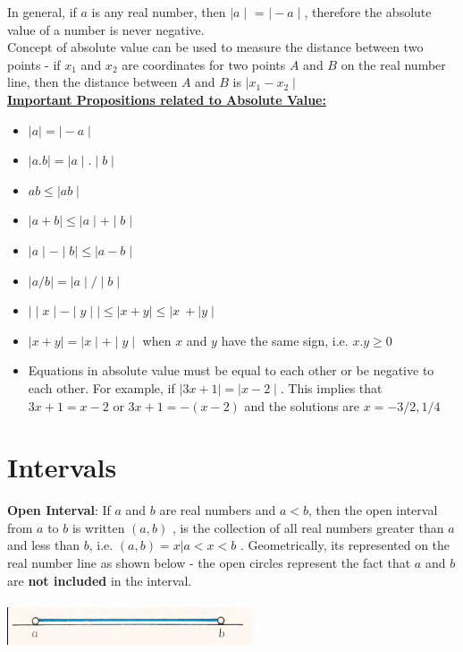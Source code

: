 \documentclass{book}
\begin{document}
In general,  if $a$ is any real number, then $\mid a \mid$ = $\mid -a \mid$, therefore the absolute value of a number is never negative. \\
Concept of absolute value can be used to measure the distance between two points - if $x_1$ and $x_2$ are coordinates for two points $A$ and $B$ on the real number line, then the distance between $A$ and $B$ is $\mid x_1 - x_2 \mid$ \\

\underline{\textbf{Important Propositions related to Absolute Value:}} \\

\begin{itemize}
	\item $\mid a \mid = \mid -a \mid$
	\item $\mid a.b \mid = \mid a \mid.\mid b \mid$
	\item $ab \leq \mid ab \mid$
	\item $\mid a+b \mid \leq \mid a \mid + \mid b \mid$
	\item $\mid a \mid - \mid b \mid \leq \mid a-b \mid$
	\item $\mid a/b \mid = \mid a \mid / \mid b \mid$
	\item $\mid \mid x \mid - \mid y \mid \mid \leq \mid x + y \mid \leq \mid x \ + \mid y \mid$
	\item $\mid x + y \mid = \mid x \mid + \mid y \mid$ when $x$ and $y$ have the same sign, i.e. $x.y \geq 0$
	\item Equations in absolute value must be equal to each other or be negative to each other. For example, if $\mid 3x +1\mid = \mid x-2 \mid $. This implies that $3x + 1 = x -2$ or $3x+1 = -(x-2)$ and the solutions are $x={-3/2,1/4}$
\end{itemize}

	\section{Intervals}
	\textbf{Open Interval}:  If $a$ and $b$ are real numbers and $a<b$,  then the open interval from $a$ to $b$ is written $(a,b)$ , is the collection of all real numbers greater than $a$ and less than $b$, i.e. $(a,b) = {{x | a<x<b}}$ . Geometrically, its represented on the real number line as shown below - the open circles represent the fact that $a$ and $b$ are \textbf{not included} in the interval. \\
	\\
	\includegraphics[scale=0.5]{openinterval}
	\\
	
\end{document}
